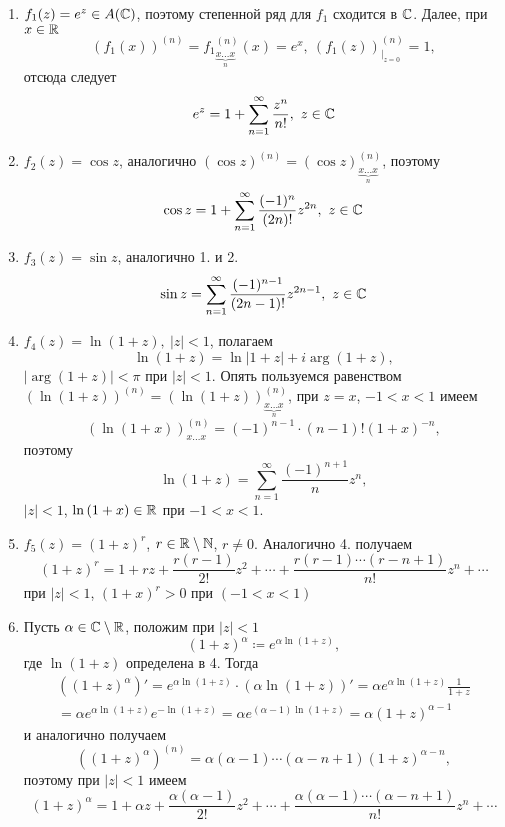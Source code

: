 \documentclass[main]{subfiles}
\begin{document}
\begin{enumerate}
    \item $f_1(z) = e^z \in A(\mathbb{C})$, поэтому степенной ряд для $f_1$ сходится в $\mathbb{C}$.
          Далее, при $x\in\mathbb{R}$
          \[ (f_1(x))^{(n)} = {f_1}_{\underbrace{x \dotsc x}_n}^{(n)}(x) = e^x,\  (f_1(z))^{(n)}_{|_{z=0}}=1, \]
          отсюда следует
          \[ e^z = 1 + \sum_{n=1}^\infty \frac{z^n}{n!},\ z\in\mathbb{C} \]
    \item $f_2(z) = \cos{z}$, аналогично $(\cos{z})^{(n)} = (\cos{z})^{(n)}_{\underbrace{x \dotsc x}_n}$, поэтому
          \[ \cos{z} = 1 + \sum_{n=1}^\infty \frac{(-1)^n}{(2n)!} z^{2n},\ z \in \mathbb{C} \]
    \item $f_3(z) = \sin{z}$, аналогично 1. и 2.
          \[ \sin{z} = \sum_{n=1}^\infty \frac{(-1)^{n-1}}{(2n-1)!} z^{2n-1},\ z \in \mathbb{C} \]
    \item $f_4(z) = \ln{(1 + z)},\ |z|<1$, полагаем
          \[\ln{(1 + z)} = \ln{|1 + z|} + i \arg(1 + z),\]
          $|\arg(1 + z)| < \pi$ при $|z| < 1$.
          Опять пользуемся равенством $(\ln{(1 + z)})^{(n)}=(\ln{(1 + z)})^{(n)}_{\underbrace{x \dotsc x}_n}$, при $z=x$, $-1 < x < 1$ имеем
          \[(\ln{(1 + x)})^{(n)}_{x \dotsc x}=(-1)^{n-1}\cdot(n-1)!(1+x)^{-n},\]
          поэтому
          \[\ln{(1 + z)} = \sum_{n=1}^\infty \frac{(-1)^{n+1}}{n} z^n,\]
          $|z|<1$, $\ln{(1+x)}\in\mathbb{R}$ при $-1<x<1$.
    \item $f_5(z) = (1 + z)^r$, $r \in \mathbb{R} \setminus \mathbb{N}$, $r \neq 0$.
          Аналогично 4. получаем
          \[(1 + z)^r = 1 + rz + \frac{r(r - 1)}{2!} z^2 + \dotsb + \frac{r(r - 1) \dotsm (r - n + 1)}{n!} z^n + \dotsb \]
          при $|z| < 1$, $(1 + x)^r > 0$ при $(-1 < x < 1)$
    \item Пусть $\alpha \in \mathbb{C} \setminus \mathbb{R}$, положим при $|z| < 1$
          \[(1 + z)^\alpha \coloneq e^{\alpha \ln{(1 + z)}},\]
          где $\ln(1 + z)$ определена в 4.
          Тогда
          \begin{multline*}
              \left( (1 + z)^\alpha \right)' = e^{\alpha \ln{(1 + z)}}  \cdot (\alpha \ln{(1 + z)})' = \alpha e^{\alpha \ln{(1 + z)}} \frac{1}{1 + z}         \\
              = \alpha e^{\alpha \ln{(1 + z)}} e^{-\ln{(1 + z)}} = \alpha e^{(\alpha - 1) \ln{(1 + z)}} = \alpha (1 + z)^{\alpha - 1}
          \end{multline*}
          и аналогично получаем
          \[ \left( (1 + z)^\alpha \right)^{(n)} = \alpha (\alpha - 1) \dotsm (\alpha - n + 1) (1 + z)^{\alpha - n}, \]
          поэтому при $|z|<1$ имеем
          \[ (1 + z)^\alpha = 1 + \alpha z + \frac{\alpha(\alpha - 1)}{2!} z^2 + \dotsb + \frac{\alpha(\alpha - 1) \dotsm (\alpha - n + 1)}{n!} z^n+ \dotsb \]
\end{enumerate}
\end{document}
